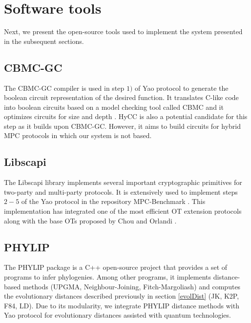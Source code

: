 \section{Software tools} \label{softTools}


Next, we present the open-source tools used to implement the system presented in the subsequent sections.

\subsection{CBMC-GC}

The CBMC-GC compiler \cite{F14} is used in step $1)$ of Yao protocol to generate the boolean circuit representation of the desired function. It translates C-like code into boolean circuits based on a model checking tool called CBMC and it optimizes circuits for size and depth \cite{Bscher2017, Buescher2016}. HyCC \cite{Bscher2018} is also a potential candidate for this step as it builds upon CBMC-GC. However, it aims to build circuits for hybrid MPC protocols in which our system is not based.

\subsection{Libscapi}

The Libscapi library \cite{Libscapi} implements several important cryptographic primitives for two-party and multi-party protocols. It is extensively used to implement steps $2-5$ of the Yao protocol in the repository MPC-Benchmark \cite{mpc_benchmark}. This implementation has integrated one of the most efficient OT extension protocols \cite{K15} along with the base OTs proposed by Chou and Orlandi \cite{C15}.

\subsection{PHYLIP}

The PHYLIP package \cite{F89} is a C++ open-source project that provides a set of programs to infer phylogenies. Among other programs, it implements distance-based methods (UPGMA, Neighbour-Joining, Fitch-Margoliash) and computes the evolutionary distances described previously in section \ref{evolDist} (JK, K2P, F84, LD). Due to its modularity, we integrate PHYLIP distance methods with Yao protocol for evolutionary distances assisted with quantum technologies.




